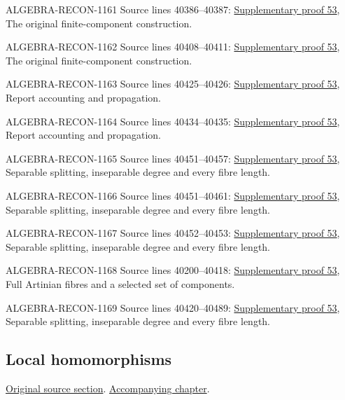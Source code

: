 \begin{AlgebraSourceRoutes}
\item[ALGEBRA-RECON-1161] Source lines 40386--40387: \hyperlink{algebra_etale_quasifinite_notes_20260928}{Supplementary proof 53}, The original finite-component construction.
\item[ALGEBRA-RECON-1162] Source lines 40408--40411: \hyperlink{algebra_etale_quasifinite_notes_20260928}{Supplementary proof 53}, The original finite-component construction.
\item[ALGEBRA-RECON-1163] Source lines 40425--40426: \hyperlink{algebra_etale_quasifinite_notes_20260928}{Supplementary proof 53}, Report accounting and propagation.
\item[ALGEBRA-RECON-1164] Source lines 40434--40435: \hyperlink{algebra_etale_quasifinite_notes_20260928}{Supplementary proof 53}, Report accounting and propagation.
\item[ALGEBRA-RECON-1165] Source lines 40451--40457: \hyperlink{algebra_etale_quasifinite_notes_20260928}{Supplementary proof 53}, Separable splitting, inseparable degree and every fibre length.
\item[ALGEBRA-RECON-1166] Source lines 40451--40461: \hyperlink{algebra_etale_quasifinite_notes_20260928}{Supplementary proof 53}, Separable splitting, inseparable degree and every fibre length.
\item[ALGEBRA-RECON-1167] Source lines 40452--40453: \hyperlink{algebra_etale_quasifinite_notes_20260928}{Supplementary proof 53}, Separable splitting, inseparable degree and every fibre length.
\item[ALGEBRA-RECON-1168] Source lines 40200--40418: \hyperlink{algebra_etale_quasifinite_notes_20260928}{Supplementary proof 53}, Full Artinian fibres and a selected set of components.
\item[ALGEBRA-RECON-1169] Source lines 40420--40489: \hyperlink{algebra_etale_quasifinite_notes_20260928}{Supplementary proof 53}, Separable splitting, inseparable degree and every fibre length.
\end{AlgebraSourceRoutes}

\subsection{Local homomorphisms}
\hypertarget{algebra-source-section-local-homomorphisms}{}
\noindent\href{https://github.com/stacks/stacks-project/blob/a04446e57ec1fbc252a871afcec7752fb2807b14/algebra.tex\#L40497}{Original source section}. \href{algebra.pdf\#nameddest=section-local-homomorphisms}{Accompanying chapter}.

